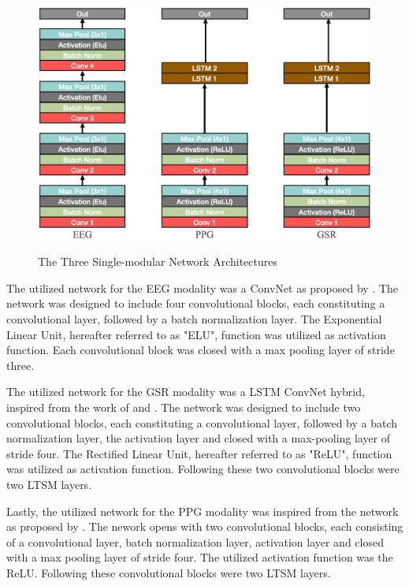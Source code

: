 \documentclass[12pt]{article}
\begin{document}
\begin{figure}
\caption{The Three Single-modular Network Architectures}
\bigskip
\includegraphics[scale=0.725]{single_model_architecture}
\label{fig:singlearchitecture}
\end{figure}

The utilized network for the EEG modality was a ConvNet as proposed by . The network was designed to include four convolutional blocks, each constituting a convolutional layer, followed by a batch normalization layer. The Exponential Linear Unit, hereafter referred to as "ELU", function was utilized as activation function. Each convolutional block was closed with a max pooling layer of stride three.

The utilized network for the GSR modality was a LSTM ConvNet hybrid, inspired from the work of  and . The network was designed to include two convolutional blocks, each constituting a convolutional layer, followed by a batch normalization layer, the activation layer and closed with a max-pooling layer of stride four. The Rectified Linear Unit, hereafter referred to as "ReLU", function was utilized as activation function. Following these two convolutional blocks were two LTSM layers.

Lastly, the utilized network for the PPG modality was inspired from the network as proposed by . The nework opens with two convolutional blocks, each consisting of a convolutional layer, batch normalization layer, activation layer and closed with a max pooling layer of stride four. The utilized activation function was the ReLU. Following these convolutional blocks were two LTSM layers.
\end{document}
